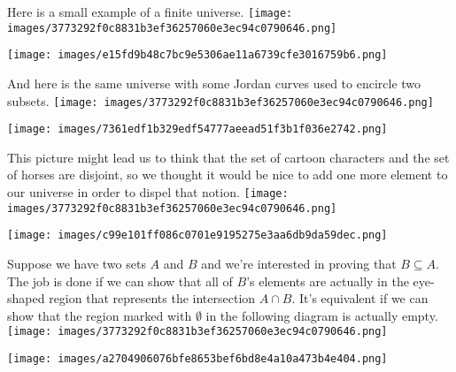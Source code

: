 \documentclass[10pt,]{book}
\theoremstyle{plain}
\theoremstyle{definition}
\theoremstyle{definition}
\numberwithin{equation}{section}
\begin{document}
    Here is a small example of a finite universe.
\texttt{[image: images/3773292f0c8831b3ef36257060e3ec94c0790646.png]}
\par

    \ifx\SetFigFont\undefined\gdef\SetFigFont#1#2#3#4#5{
    \reset@font\fontsize{#1}{#2pt}
    \fontfamily{#3}\fontseries{#4}\fontshape{#5}
    \selectfont}\fi
\texttt{[image: images/e15fd9b48c7bc9e5306ae11a6739cfe3016759b6.png]}
\par

    And here is the same universe with some Jordan curves
    used to encircle two subsets.
\texttt{[image: images/3773292f0c8831b3ef36257060e3ec94c0790646.png]}
\par

    \ifx\SetFigFont\undefined\gdef\SetFigFont#1#2#3#4#5{
    \reset@font\fontsize{#1}{#2pt}
    \fontfamily{#3}\fontseries{#4}\fontshape{#5}
    \selectfont}\fi
\texttt{[image: images/7361edf1b329edf54777aeead51f3b1f036e2742.png]}
\par

    This picture might lead us to think that the set of cartoon characters
    and the set of horses are disjoint, so we thought it would be nice
    to add one more element to our universe in order to dispel that notion.
\texttt{[image: images/3773292f0c8831b3ef36257060e3ec94c0790646.png]}
\par

    \ifx\SetFigFont\undefined\gdef\SetFigFont#1#2#3#4#5{
    \reset@font\fontsize{#1}{#2pt}
    \fontfamily{#3}\fontseries{#4}\fontshape{#5}
    \selectfont}\fi
\texttt{[image: images/c99e101ff086c0701e9195275e3aa6db9da59dec.png]}
\par

    Suppose we have two sets \(A\) and \(B\) and we're interested
    in proving that \(B \subseteq A\). The job is done if we can show that
    all of \(B\)'s elements are actually in the eye-shaped region that represents
    the intersection \(A \cap B\). It's equivalent if we can show that the
    region marked with \(\emptyset\) in the following diagram is actually empty.
\texttt{[image: images/3773292f0c8831b3ef36257060e3ec94c0790646.png]}
\par

    \ifx\SetFigFont\undefined\gdef\SetFigFont#1#2#3#4#5{
    \reset@font\fontsize{#1}{#2pt}
    \fontfamily{#3}\fontseries{#4}\fontshape{#5}
    \selectfont}\fi
\texttt{[image: images/a2704906076bfe8653bef6bd8e4a10a473b4e404.png]}
\par
\end{document}
